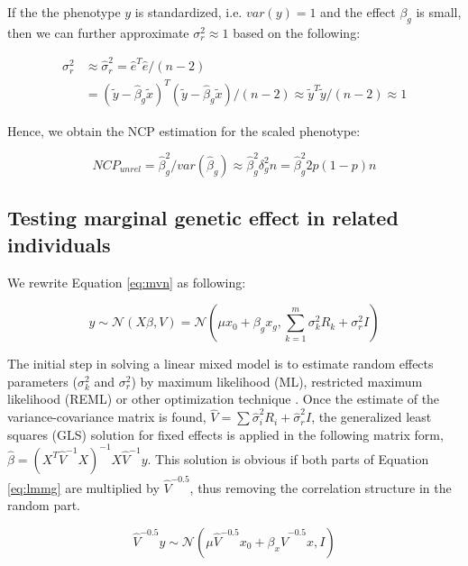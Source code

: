 \documentclass[]{book}
\begin{document}
If the the phenotype \(y\) is standardized, i.e. \(var(y) = 1\) and the
effect \(\beta_g\) is small, then we can further approximate
\(\sigma_r^2 \approx 1\) based on the following:

\begin{equation}
\begin{split}
\sigma^2_r & \approx \hat{\sigma}^2_r = \hat{e}^T \hat{e} / (n - 2) \\
& = (\tilde{y} - \hat{\beta}_g \tilde{x})^T (\tilde{y} - \hat{\beta}_g \tilde{x}) / (n - 2) \approx \tilde{y}^T \tilde{y} / (n - 2) \approx 1
\end{split}
\label{eq:sigma2r}
\end{equation}

Hence, we obtain the NCP estimation for the scaled phenotype:

\begin{equation}
NCP_{unrel} = \hat{\beta}_g^2 / var(\hat{\beta}_g) \approx \hat{\beta}_g^2 \delta_g^2 n  = \hat{\beta}_g^2 2 p (1 - p) n
\label{eq:ncplmg}
\end{equation}

\subsection{Testing marginal genetic effect in related
individuals}\label{lmmg}

We rewrite Equation \eqref{eq:mvn} as following:

\begin{equation}
  y \sim \mathcal{N} (X \beta, V) = \mathcal{N} (\mu x_0 + \beta_g x_g, \sum_{k=1}^{m}{\sigma_k^2 R_k} + \sigma_r^2 I) 
\label{eq:lmmg}
\end{equation}

The initial step in solving a linear mixed model is to estimate random
effects parameters (\(\sigma_k^2\) and \(\sigma_r^2\)) by maximum
likelihood (ML), restricted maximum likelihood (REML) or other
optimization technique \citep{Lynch1998}. Once the estimate of the
variance-covariance matrix is found,
\(\hat{V} = \sum{\hat{\sigma}_i^2 R_i} + \hat{\sigma}_r^2 I\), the
generalized least squares (GLS) solution for fixed effects is applied in
the following matrix form,
\(\hat{\beta} = \left(X^T \hat{V}^{-1} X\right)^{-1} X \hat{V}^{-1} y\).
This solution is obvious if both parts of Equation \eqref{eq:lmmg} are
multiplied by \(\hat{V}^{-0.5}\), thus removing the correlation
structure in the random part.

\begin{equation}
  \hat{V}^{-0.5} y \sim \mathcal{N} (\mu \hat{V}^{-0.5} x_0 + \beta_x \hat{V}^{-0.5} x , I)
\label{eq:lmmg2}
\end{equation}
\end{document}

